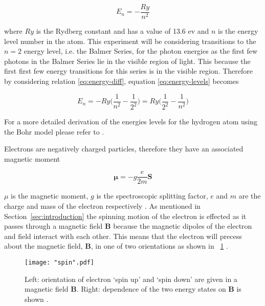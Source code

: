 \documentclass{article}
\newcommand{\figref}[2][\figurename~]{#1\ref{#2}}
\newcommand{\secref}[2][Section~]{#1\ref{#2}}
\begin{document}
\begin{equation}
\label{eq:energy-levels}
E_n = -\frac{Ry}{n^2}
\end{equation}

\vspace{2mm}
\noindent
where $Ry$ is the Rydberg constant and has a value of 13.6 ev and $n$ is the energy level number in the atom. This experiment will be considering transitions to the $n = 2$ energy level, i.e. the Balmer Series, for the photon energies as the first few photons in the Balmer Series lie in the visible region of light. This because the first first few energy transitions for this series is in the visible region. Therefore by considering relation \eqref{eq:energy-diff}, equation \eqref{eq:energy-levels} becomes

\begin{equation}
\label{eq:balmer-series}
E_n = -Ry\Bigg(\frac{1}{n^2} - \frac{1}{2^2}\Bigg) = Ry\Bigg(\frac{1}{2^2} - \frac{1}{n^2}\Bigg)
\end{equation}

\vspace{2mm}
\noindent
For a more detailed derivation of the energies levels for the hydrogen atom using the Bohr model please refer to \cite{Book02}.

\vspace{2mm}
\noindent
Electrons are negatively charged particles, therefore they have an associated magnetic moment

\begin{equation}
\label{eq:spin}
\boldsymbol{\mu} = -g\frac{e}{2m}\textbf{S}
\end{equation}

\vspace{2mm}
\noindent
\textbf{$\mu$} is the magnetic moment, $g$ is the spectroscopic splitting factor, $e$ and $m$ are the charge and mass of the electron respectively \cite{Paper02}. As mentioned in \secref{sec:introduction} the spinning motion of the electron is effected as it passes through a magnetic field \textbf{B} because the magnetic dipoles of the electron and field interact with each other. This means that the electron will precess about the magnetic field, \textbf{B}, in one of two orientations as shown in \figref{fig:spin} \cite{Paper02}.

\begin{figure}[h]
\centering
\texttt{[image: "spin".pdf]}
\caption{Left: orientation of electron `spin up' and `spin down' are given in a magnetic field \textbf{B}. Right: dependence of the two energy states on \textbf{B} is shown \cite{Paper02}.}
\label{fig:spin}
\end{figure}
\end{document}
